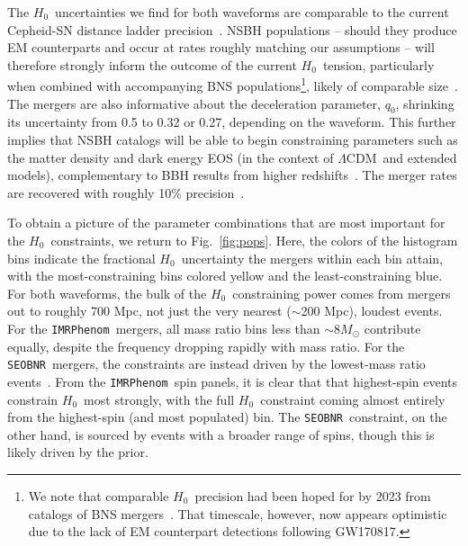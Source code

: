 \documentclass[%
 reprint,
 superscriptaddress,
 nofootinbib,
 amsmath,amssymb,
 aps,
]{revtex4-2}
\newcommand{\msun}{M_\odot}
\newcommand{\hubble}{\ensuremath{H_0}}
\newcommand{\lcdm}{$\Lambda$CDM}
\newcommand{\seobnr}{\texttt{SEOBNR}}
\newcommand{\imrp}{\texttt{IMRPhenom}}
\begin{document}
The \hubble\ uncertainties we find for both waveforms are comparable to the current Cepheid-SN distance ladder precision~\cite{Riess_etal:2019}. NSBH populations -- should they produce EM counterparts and occur at rates roughly matching our assumptions -- will therefore strongly inform the outcome of the current \hubble\ tension, particularly when combined with accompanying BNS populations\footnote{We note that comparable \hubble\ precision had been hoped for by 2023 from catalogs of BNS mergers~\cite{Chen_etal:2018}. That timescale, however, now appears optimistic due to the lack of EM counterpart detections following GW170817.}, likely of comparable size~\cite{Chen_etal:2018,Feeney_etal:2018,Vitale_Chen:2018,Mortlock_etal:2019}. The mergers are also informative about the deceleration parameter, $q_0$, shrinking its uncertainty from 0.5 to 0.32 or 0.27, depending on the waveform. This further implies that NSBH catalogs will be able to begin constraining parameters such as the matter density and dark energy EOS (in the context of \lcdm\ and extended models), complementary to BBH results from higher redshifts~\cite{Farr_etal:2019,Chen_etal:2020,Mukherjee_etal:2020b}. The merger rates are recovered with roughly 10\% precision~\cite[e.g.,][]{Ligo:2018,Abbott_etal:2018,LVC:2020O3acat,LVC_O2_pop}.

To obtain a picture of the parameter combinations that are most important for the \hubble\ constraints, we return to Fig.~\ref{fig:pops}. Here, the colors of the histogram bins indicate the fractional \hubble\ uncertainty the mergers within each bin attain, with the most-constraining bins colored yellow and the least-constraining blue. For both waveforms, the bulk of the \hubble\ constraining power comes from mergers out to roughly 700 Mpc, not just the very nearest ($\sim$200 Mpc), loudest events. For the \imrp\ mergers, all mass ratio bins less than $\sim$8$\msun$ contribute equally, despite the frequency dropping rapidly with mass ratio. For the \seobnr\ mergers, the constraints are instead driven by the lowest-mass ratio events~\cite[e.g., ][]{Apostolatos_etal:1994,Cutler_Flanagan:1994}. From the \imrp\ spin panels, it is clear that that highest-spin events constrain \hubble\ most strongly, with the full \hubble\ constraint coming almost entirely from the highest-spin (and most populated) bin. The \seobnr\ constraint, on the other hand, is sourced by events with a broader range of spins, though this is likely driven by the prior.
\end{document}
